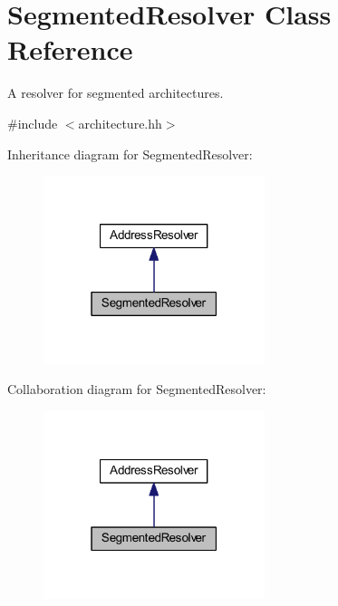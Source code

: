 \hypertarget{class_segmented_resolver}{}\section{Segmented\+Resolver Class Reference}
\label{class_segmented_resolver}


A resolver for segmented architectures.  




{\ttfamily \#include $<$architecture.\+hh$>$}



Inheritance diagram for Segmented\+Resolver\+:
\nopagebreak
\begin{figure}[H]
\begin{center}
\leavevmode
\includegraphics[width=183pt]{class_segmented_resolver__inherit__graph}
\end{center}
\end{figure}


Collaboration diagram for Segmented\+Resolver\+:
\nopagebreak
\begin{figure}[H]
\begin{center}
\leavevmode
\includegraphics[width=183pt]{class_segmented_resolver__coll__graph}
\end{center}
\end{figure}
